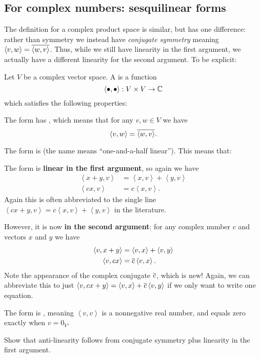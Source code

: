 \subsection{For complex numbers: sesquilinear forms}
The definition for a complex product space is similar, but has one difference:
rather than symmetry we instead have \emph{conjugate symmetry}
meaning $\left< v, w \right> = \overline{ \left< w,v \right> }$.
Thus, while we still have linearity in the first argument,
we actually have a different linearity for the second argument.
To be explicit:
\begin{definition}
	Let $V$ be a complex vector space.
	A  is a function
	\[ \left< \bullet, \bullet \right> : V \times V \to \mathbb C \]
	which satisfies the following properties:
	\begin{itemize}
		\ii The form has , which means that
		for any $v,w \in V$ we have
		\[ \left< v,w \right> = \overline{\left< w,v\right>}. \]

		\ii The form is 
		(the name means ``one-and-a-half linear'').
		This means that:
		\begin{itemize}
		\ii The form is \textbf{linear in the first argument}, so again we have
		\begin{align*}
			\left< x+y, v \right> &= \left< x,v \right> + \left< y,v \right> \\
			\left< cx, v \right> &= c\left< x,v \right>.
		\end{align*}
		Again this is often abbreviated to the single line
		$\left< cx+y, v \right> = c \left< x,v \right> + \left< y,v \right>$
		in the literature.

		\ii However, it is now \textbf{
		in the second argument}:
		for any complex number $c$ and vectors $x$ and $y$ we have
		\begin{align*}
			\left< v, x+y\right> &= \left< v, x\right> + \left< v,y \right> \\
			\left< v, cx \right> &= \overline c \left< v, x\right>.
		\end{align*}
		Note the appearance of the complex conjugate $\overline c$,
		which is new!
		Again, we can abbreviate this to just
		$\left< v, cx+y \right> = \left< v,x \right> + \overline c \left< v,y\right>$
		if we only want to write one equation.
		\end{itemize}

		\ii The form is ,
		meaning $\left<v,v\right>$ is a nonnegative real number,
		and equals zero exactly when $v = 0_V$.
	\end{itemize}
\end{definition}
\begin{exercise}
	Show that anti-linearity follows
	from conjugate symmetry plus linearity in the first argument.
\end{exercise}

